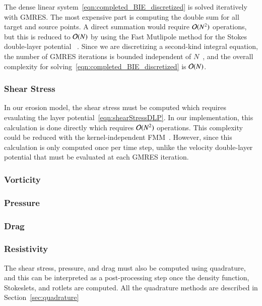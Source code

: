 \documentclass[preprint, 10pt]{elsarticle}
\begin{document}
The dense linear system~\eqref{eqn:completed_BIE_discretized} is solved
iteratively with GMRES.  The most expensive part is computing the
double sum for all target and source points.  A direct summation would
require ${\mathcal{O}}(N^2)$ operations, but this is reduced to ${\mathcal{O}}(N)$ by
using the Fast Mutlipole method for the Stokes double-layer
potential~\cite{gre-rok1987,rac-???} .  Since we are discretizing a second-kind integral
equation, the number of GMRES iterations is bounded independent of
$N$~\cite{cam-ips-kel-mey-xue1996}, and the overall complexity for
solving~\eqref{eqn:completed_BIE_discretized} is ${\mathcal{O}}(N)$.

\subsubsection{Shear Stress}
In our erosion model, the shear stress must be computed which requires
evaulating the layer potential~\eqref{eqn:shearStressDLP}.  In our
implementation, this calculation is done directly which requires
${\mathcal{O}}(N^2)$ operations.  This complexity could be reduced with
the kernel-independent FMM~\cite{yin-bir-zor2004}.  However, since this
calculation is only computed once per time step, unlike the velocity
double-layer potential that must be evaluated at each GMRES iteration.  


\subsubsection{Vorticity}


\subsubsection{Pressure}


\subsubsection{Drag}



\subsubsection{Resistivity}



The shear stress, pressure, and drag must also be computed using
quadrature, and this can be interpreted as a post-processing step once
the density function, Stokeslets, and rotlets are computed.  All the
quadrature methods are described in Section~\ref{sec:quadrature}
\end{document}
